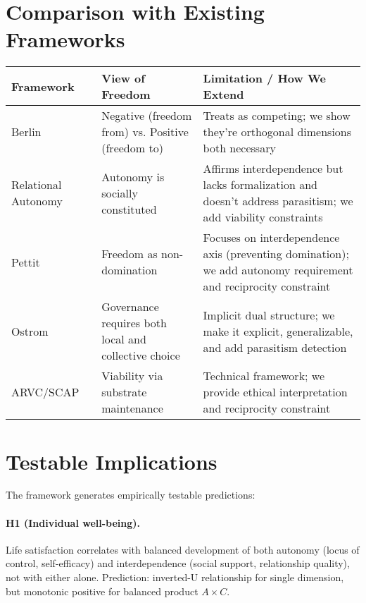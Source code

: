 \documentclass[11pt,a4paper]{article}
\begin{document}
\section{Comparison with Existing Frameworks}

\begin{center}
\footnotesize
\begin{tabular}{|l|p{3.5cm}|p{6cm}|}
\hline
\textbf{Framework} & \textbf{View of Freedom} & \textbf{Limitation / How We Extend} \\ \hline
Berlin~\cite{berlin} & Negative (freedom from) vs. Positive (freedom to) & Treats as competing; we show they're orthogonal dimensions both necessary \\ \hline
Relational Autonomy~\cite{mackenzie} & Autonomy is socially constituted & Affirms interdependence but lacks formalization and doesn't address parasitism; we add viability constraints \\ \hline
Pettit~\cite{pettit} & Freedom as non-domination & Focuses on interdependence axis (preventing domination); we add autonomy requirement and reciprocity constraint \\ \hline
Ostrom~\cite{ostrom} & Governance requires both local and collective choice & Implicit dual structure; we make it explicit, generalizable, and add parasitism detection \\ \hline
ARVC/SCAP~\cite{arvc,scap} & Viability via substrate maintenance & Technical framework; we provide ethical interpretation and reciprocity constraint \\ \hline
\end{tabular}
\end{center}

\section{Testable Implications}

The framework generates empirically testable predictions:

\paragraph{H1 (Individual well-being).} Life satisfaction correlates with balanced development of both autonomy (locus of control, self-efficacy) and interdependence (social support, relationship quality), not with either alone. Prediction: inverted-U relationship for single dimension, but monotonic positive for balanced product $A \times C$.
\end{document}
